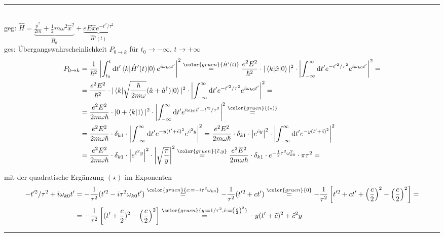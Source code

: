 \documentclass{article}
\newcommand{\diff}{\mathrm{d}}
\newcommand{\lr}[1]{\left(#1\right)}
\newcommand{\lreck}[1]{\left[#1\right]}
\newcommand{\comment}[1]{{\color{gruen} {#1}}}
\begin{document}
{\color{blue}
\hrule
	\\
	geg: $\hat{H} = \underbrace{ \frac{\hat{p}^2}{2m} + \frac{1}{2}m\omega^2\hat{x}^2 }_{\hat{H}_0} + \underbrace{ e E \hat{x} e^{-t^2/\tau^2} }_{\hat{H}'(t)}$ \\
	ges: Übergangswahrscheinlichkeit $P_{0\to k}$ für $t_0 \to -\infty$, $t\to +\infty$
		\begin{align*}
			P_{0\to k} &= \frac{1}{\hbar^2} \left| \int_{t_0}^t \diff t' \braket{k | \hat{H}'(t) | 0} e^{i \omega_{k0}t'} \right|^2 \stackrel{\comment{\hat{H}'(t)}}{=} \frac{e^2 E^2}{\hbar^2} \cdot |\braket{k | \hat{x} | 0}|^2 \cdot \left| \int_{-\infty}^\infty \diff t' e^{-t'^2/\tau^2} e^{i \omega_{k0} t'} \right|^2 = \\
			&= \frac{e^2 E^2}{\hbar^2} \cdot |\braket{k | \sqrt{\frac{\hbar}{2m\omega}} (\hat{a} + \hat{a}^\dagger) | 0}|^2 \cdot \left| \int_{-\infty}^\infty \diff t' e^{-t'^2/\tau^2} e^{i \omega_{k0} t'} \right|^2 = \\
			 &= \frac{e^2 E^2}{2m\omega\hbar} \cdot |0 + \braket{k|1}|^2 \cdot \left|\int_{-\infty}^\infty \diff t' e^{i\omega_{k0}t' - t'^2/\tau^2} \right|^2 \stackrel{\comment{(\star)}}{=} \\
			 &= \frac{e^2 E^2}{2m\omega\hbar} \cdot \delta_{k1} \cdot \left| \int_{-\infty}^\infty \diff t' e^{-y(t' + \tilde{c})^2} e^{\tilde{c}^2y} \right|^2 = \frac{e^2 E^2}{2m\omega\hbar} \cdot \delta_{k1} \cdot \left| e^{\tilde{c}y} \right|^2 \cdot \left| \int_{-\infty}^\infty \diff t' e^{-y(t' + \tilde{c})^2} \right|^2 \\
			 &= \frac{e^2 E^2}{2m\omega\hbar} \cdot \delta_{k1} \cdot \left| e^{\tilde{c}^2y} \right|^2 \cdot \left| \sqrt{\frac{\pi}{y}} \right|^2 \stackrel{\comment{\tilde{c},y}}{=} \frac{e^2 E^2}{2m\omega\hbar} \cdot \delta_{k1} \cdot e^{-\frac{1}{2}\tau^2 \omega_{k0}^2} \cdot \pi \tau^2 = 
		\end{align*}
	
	mit der quadratische Ergänzung {\color{gruen}$(\star)$} im Exponenten
		\begin{align*}
			-t'^2/\tau^2 + i\omega_{k0}t' &= -\frac{1}{\tau^2}(t'^2 - i\tau^2\omega_{k0}t') \stackrel{\comment{c:=-i\tau^2 \omega_{k0}}}{=} -\frac{1}{\tau^2}(t'^2 + ct') \stackrel{\comment{0}}{=} -\frac{1}{\tau^2} \lreck{ t'^2 + ct' + \lr{\frac{c}{2}}^2 - \lr{\frac{c}{2}}^2} = \\
			 &= -\frac{1}{\tau^2} \lreck{ (t' + \frac{c}{2})^2 - \lr{\frac{c}{2}}^2 } \stackrel{\comment{y:=1/\tau^2, \tilde{c}:=\lr{\frac{c}{2}}^2}}{=} -y(t' + \tilde{c})^2 + \tilde{c}^2 y
		\end{align*}
\hrule
}
\end{document}
